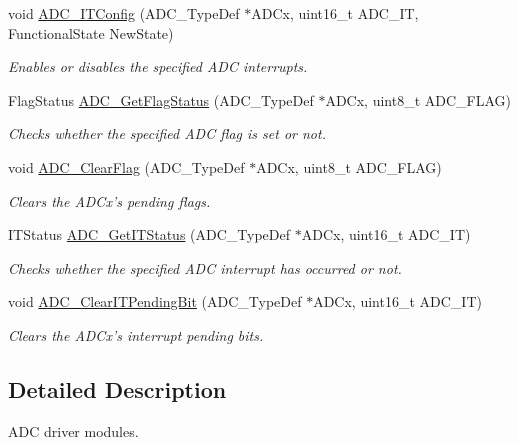 \begin{DoxyCompactItemize}
void \hyperlink{group___a_d_c_gad4c84b54b539944f555488bf979f82b6}{A\-D\-C\-\_\-\-I\-T\-Config} (A\-D\-C\-\_\-\-Type\-Def $\ast$A\-D\-Cx, uint16\-\_\-t A\-D\-C\-\_\-\-I\-T, Functional\-State New\-State)
\begin{DoxyCompactList}\small\item\em Enables or disables the specified A\-D\-C interrupts. \end{DoxyCompactList}\item 
Flag\-Status \hyperlink{group___a_d_c_gaa12546e51ec905c90a3aada432bd4633}{A\-D\-C\-\_\-\-Get\-Flag\-Status} (A\-D\-C\-\_\-\-Type\-Def $\ast$A\-D\-Cx, uint8\-\_\-t A\-D\-C\-\_\-\-F\-L\-A\-G)
\begin{DoxyCompactList}\small\item\em Checks whether the specified A\-D\-C flag is set or not. \end{DoxyCompactList}\item 
void \hyperlink{group___a_d_c_gaf34f36798f811b4a41321ea2d12118d4}{A\-D\-C\-\_\-\-Clear\-Flag} (A\-D\-C\-\_\-\-Type\-Def $\ast$A\-D\-Cx, uint8\-\_\-t A\-D\-C\-\_\-\-F\-L\-A\-G)
\begin{DoxyCompactList}\small\item\em Clears the A\-D\-Cx's pending flags. \end{DoxyCompactList}\item 
I\-T\-Status \hyperlink{group___a_d_c_gaa1d3b910a83dbf14d4f68c8eef058612}{A\-D\-C\-\_\-\-Get\-I\-T\-Status} (A\-D\-C\-\_\-\-Type\-Def $\ast$A\-D\-Cx, uint16\-\_\-t A\-D\-C\-\_\-\-I\-T)
\begin{DoxyCompactList}\small\item\em Checks whether the specified A\-D\-C interrupt has occurred or not. \end{DoxyCompactList}\item 
void \hyperlink{group___a_d_c_ga601c6a67bd883eb631ecc7aa5e999b9c}{A\-D\-C\-\_\-\-Clear\-I\-T\-Pending\-Bit} (A\-D\-C\-\_\-\-Type\-Def $\ast$A\-D\-Cx, uint16\-\_\-t A\-D\-C\-\_\-\-I\-T)
\begin{DoxyCompactList}\small\item\em Clears the A\-D\-Cx's interrupt pending bits. \end{DoxyCompactList}\end{DoxyCompactItemize}


\subsection{Detailed Description}
A\-D\-C driver modules. 

